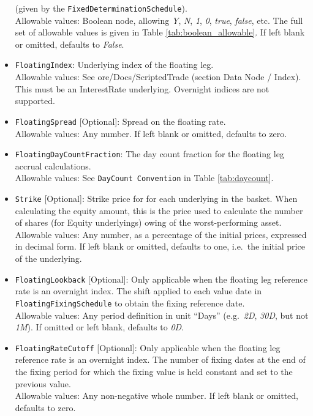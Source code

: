 \begin{itemize}
  (given by the \lstinline!FixedDeterminationSchedule!). \\
    Allowable values: Boolean node, allowing \emph{Y}, \emph{N}, \emph{1}, \emph{0},
    \emph{true}, \emph{false}, etc. The full set of allowable values is given in Table
    \ref{tab:boolean_allowable}. If left blank or omitted, defaults to \emph{False}.
  \item \lstinline!FloatingIndex!: Underlying index of the floating leg. \\
    Allowable values: See ore/Docs/ScriptedTrade (section Data Node / Index). This must
    be an InterestRate underlying. Overnight indices are not supported.
  \item \lstinline!FloatingSpread! [Optional]: Spread on the floating rate. \\
    Allowable values: Any number. If left blank or omitted, defaults to zero.
  \item \lstinline!FloatingDayCountFraction!: The day count fraction for the floating leg
  accrual calculations. \\
    Allowable values: See \lstinline!DayCount Convention! in Table \ref{tab:daycount}.
  \item \lstinline!Strike! [Optional]: Strike price for for each underlying in the basket.
  When calculating the equity amount, this is the price used to calculate the number of
  shares (for Equity underlyings) owing of the worst-performing asset. \\
    Allowable values: Any number, as a percentage of the initial prices, expressed in decimal
    form. If left blank or omitted, defaults to one, i.e.\ the initial price of the
    underlying.
  \item \lstinline!FloatingLookback! [Optional]: Only applicable when the floating leg reference
  rate is an overnight index. The shift applied to each value date in \lstinline!FloatingFixingSchedule!
  to obtain the fixing reference date. \\
    Allowable values: Any period definition in unit ``Days'' (e.g.\ \emph{2D}, \emph{30D}, but not \emph{1M}).
    If omitted or left blank, defaults to \emph{0D}.
  \item \lstinline!FloatingRateCutoff! [Optional]: Only applicable when the floating leg reference
  rate is an overnight index. The number of fixing dates at the end of the fixing period for which
  the fixing value is held constant and set to the previous value. \\
    Allowable values: Any non-negative whole number. If left blank or omitted, defaults to zero.

\end{itemize}
